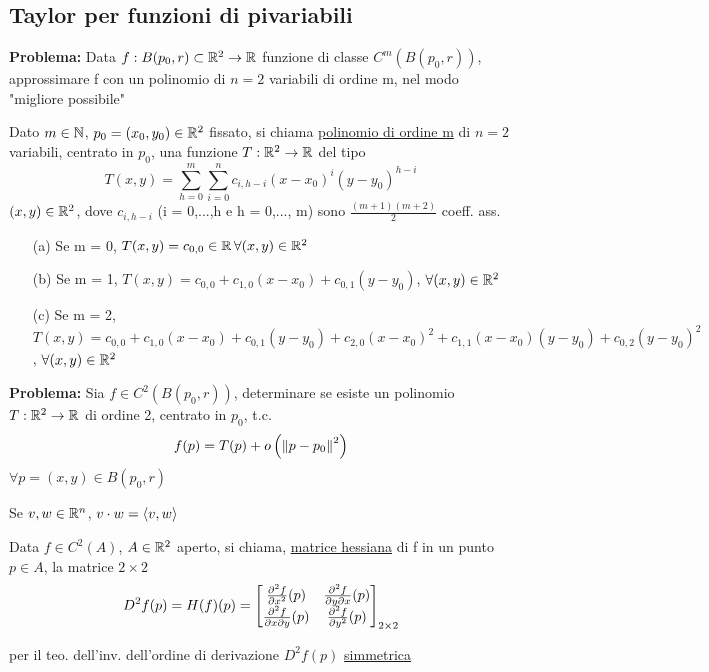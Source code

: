\subsection{Taylor per funzioni di pi\acu variabili}
\textbf{Problema:} Data $f: B(p_0,r) \subset \mathbb{R}^2 \to \mathbb{R}$ funzione di classe $C^m\left(B(p_0,r)\right)$, 
approssimare f con un polinomio di $n=2$ variabili di ordine m, nel modo "migliore possibile"
\begin{definition}
  Dato $m \in \mathbb{N}$, $p_0 = (x_0,y_0) \in \mathbb{R}^2$ fissato, si chiama \underline{polinomio di ordine m} di $n=2$ variabili,
  centrato in $p_0$, una funzione $T: \mathbb{R}^2 \to \mathbb{R}$ del tipo
  $$T(x,y) = \sum_{h=0}^{m} \sum_{i = 0}^n c_{i,h-i} (x-x_0)^i(y-y_0)^{h-i}$$
  $(x,y)\in \mathbb{R}^2$, dove $c_{i,h-i}$ (i = 0,...,h e h = 0,..., m) sono $\frac{(m+1)(m+2)}{2}$ coeff. ass. 
\end{definition}
\begin{example}
  \begin{itemize}
    \item[(a)] Se m = 0, $T(x,y) = c_{0,0} \in \mathbb{R} \, \forall (x,y) \in \mathbb{R}^2$
    \item[(b)] Se m = 1, $T(x,y) = c_{0,0} + c_{1,0}(x-x_0)+ c_{0,1}(y-y_0)$, $\forall (x,y)\in \mathbb{R}^2$
    \item[(c)] Se m = 2, $T(x,y) = c_{0,0} + c_{1,0}(x-x_0)+ c_{0,1}(y-y_0) + c_{2,0}(x-x_0)^2 + c_{1,1}(x-x_0)(y-y_0)
                + c_{0,2}(y-y_0)^2$, $\forall (x,y)\in \mathbb{R}^2$  
  \end{itemize}
\end{example}
\textbf{Problema:} Sia $f \in C^2\left(B(p_0,r)\right)$, determinare se esiste un polinomio $T: \mathbb{R}^2 \to \mathbb{R}$ di 
ordine 2, centrato in $p_0$, t.c. $$f(p) = T(p) + o\left(\left\lVert p-p_0\right\rVert^2\right)$$
$\forall p = (x,y) \in B(p_0,r)$
\begin{notazione}
  Se $v,w \in \mathbb{R}^n$, $v \cdot w = \left\langle v,w \right\rangle$
\end{notazione}
\begin{definition}
  Data $f \in C^2(A)$, $A \in \mathbb{R}^2$ aperto, si chiama, \underline{matrice hessiana}
  di f in un punto $p\in A$, la matrice $2\times 2$
  $$D^2f(p) = H(f)(p) = \begin{bmatrix}
    \frac{\partial^2 f}{\partial x^2}(p) & \frac{\partial^2 f}{\partial y \partial x}(p) \\
    \frac{\partial^2 f}{\partial x \partial y}(p) & \frac{\partial^2 f}{\partial y^2}(p) \\
  \end{bmatrix}_{2\times 2}$$
\end{definition}
\begin{osservazione}
  per il teo. dell'inv. dell'ordine di derivazione $D^2 f(p)$ \ace \underline{simmetrica}
\end{osservazione}
